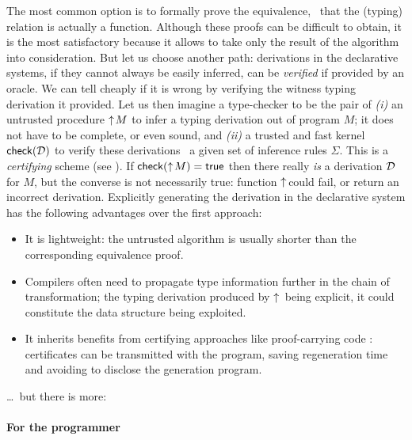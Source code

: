 \documentclass{llncs}
\begin{document}
The most common option is to formally prove the equivalence, \ie\ that
the (typing) relation is actually a function. Although these proofs
can be difficult to obtain, it is the most satisfactory because it
allows to take only the result of the algorithm into
consideration. But let us choose another path: derivations in the
declarative systems, if they cannot always be easily inferred, can be
\emph{verified} if provided by an oracle. We can tell cheaply if it is
wrong by verifying the witness typing derivation it provided. Let us
then imagine a type-checker to be the pair of \emph{(i)} an untrusted
procedure $\uparrow\!{M}$ to infer a typing derivation out of program $M$;
it does not have to be complete, or even sound, and \emph{(ii)} a
trusted and fast kernel ${\text{\textsf{check}}}({\mathcal D})$ to verify these derivations
\wrt\ a given set of inference rules $\Sigma$. This is a
\emph{certifying} scheme (see \cite{leroy2006compcert}). If ${\text{\textsf{check}}}({\uparrow\!{M}}) = \text{\textsf{true}}$ then there really \emph{is} a derivation $\mathcal D$ for
$M$, but the converse is not necessarily true: function
$\uparrow\!{}\!\!$ could fail, or return an incorrect
derivation. Explicitly generating the derivation in the declarative
system has the following advantages over the first approach:
\begin{itemize}
\item It is lightweight: the untrusted algorithm is usually shorter
  than the corresponding equivalence proof.
\item Compilers often need to propagate type information further in
  the chain of transformation; the typing derivation produced by
  $\uparrow\!{}$ being explicit, it could constitute the data structure
  being exploited.
\item It inherits benefits from certifying approaches like
  proof-carrying code \cite{necula1997proof}: certificates can be
  transmitted with the program, saving regeneration time and avoiding
  to disclose the generation program.
\end{itemize}
\ldots\ but there is more:

\paragraph{For the programmer}
\end{document}
